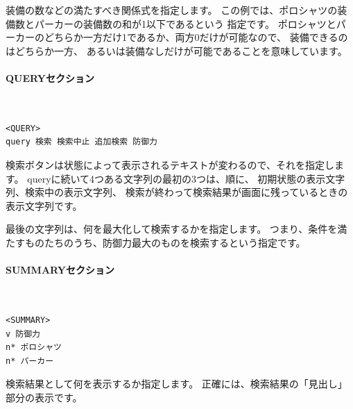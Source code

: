 \documentclass[dvipdfmx]{jsarticle}
\begin{document}
装備の数などの満たすべき関係式を指定します。
この例では、ポロシャツの装備数とパーカーの装備数の和が1以下であるという
指定です。
ポロシャツとパーカーのどちらか一方だけ1であるか、両方0だけが可能なので、
装備できるのはどちらか一方、
あるいは装備なしだけが可能であることを意味しています。

\paragraph{QUERYセクション}~\medskip
{\footnotesize\begin{mdframed}\begin{Verbatim}
<QUERY>
query 検索 検索中止 追加検索 防御力
\end{Verbatim}
\end{mdframed}}
\medskip

検索ボタンは状態によって表示されるテキストが変わるので、それを指定します。
queryに続いて4つある文字列の最初の3つは、順に、
初期状態の表示文字列、検索中の表示文字列、
検索が終わって検索結果が画面に残っているときの表示文字列です。

最後の文字列は、何を最大化して検索するかを指定します。
つまり、条件を満たすものたちのうち、防御力最大のものを検索するという指定です。

\begin{center}
\end{center}

\paragraph{SUMMARYセクション}~\medskip
{\footnotesize\begin{mdframed}\begin{Verbatim}
<SUMMARY>
v 防御力
n* ポロシャツ
n* パーカー
\end{Verbatim}
\end{mdframed}}
\medskip

検索結果として何を表示するか指定します。
正確には、検索結果の「見出し」部分の表示です。
\end{document}
